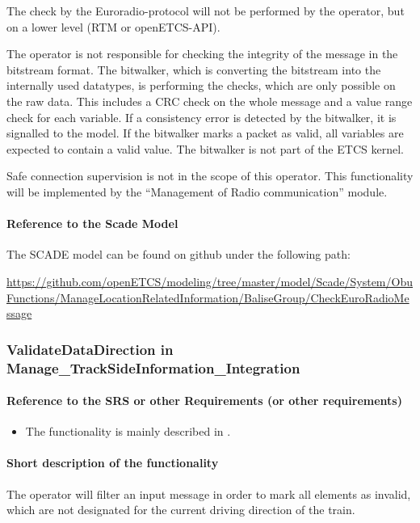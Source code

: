 The check by the Euroradio-protocol \cite[3.16.3.1.1]{subset-026} will not be performed by the operator, but on a lower level (RTM or openETCS-API).

The operator is not responsible for checking the integrity of the message in the bitstream format. The bitwalker, which is converting the bitstream into the internally used datatypes, is performing the checks, which are only possible on the raw data. This includes a CRC check on the whole message and a value range check for each variable. If a consistency error is detected by the bitwalker, it is signalled to the model. If the bitwalker marks a packet as valid, all variables are expected to contain a valid value. The bitwalker is not part of the ETCS kernel.

Safe connection supervision is not in the scope of this operator. This functionality will be implemented by the ``Management of Radio communication'' module.

\paragraph{Reference to the Scade Model}
The SCADE model can be found on github under the following path:

\tiny\url{https://github.com/openETCS/modeling/tree/master/model/Scade/System/ObuFunctions/ManageLocationRelatedInformation/BaliseGroup/CheckEuroRadioMessage}
\normalsize

\subsubsection{ValidateDataDirection in Manage\_TrackSideInformation\_Integration}

\paragraph{Reference to the SRS or other Requirements (or other requirements)}
\begin{itemize}
 \item The functionality is mainly described in \cite[Chapter~3.6.3]{subset-026}.
\end{itemize}
\paragraph{Short description of the functionality}
The operator will filter an input message in order to mark all elements as invalid, which are not designated for the current driving direction of the train.

